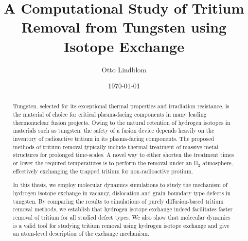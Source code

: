 \documentclass[english,twoside,openright]{HYgradu}
\title{A Computational Study of Tritium Removal from Tungsten using Isotope Exchange}
\author{Otto Lindblom}
\date{\today}
\begin{document}
\maketitle


\begin{abstract}
Tungsten, selected for its exceptional thermal properties and irradiation resistance, is the material of choice for critical plasma-facing components in many leading thermonuclear fusion projects.
Owing to the natural retention of hydrogen isotopes in materials such as tungsten, the safety of a fusion device depends heavily on the inventory of radioactive tritium in its plasma-facing components. 
The proposed methods of tritium removal typically include thermal treatment of massive metal structures for prolonged time-scales.
A novel way to either shorten the treatment times or lower the required temperatures is to perform the removal under an H$_2$ atmosphere, effectively exchanging the trapped tritium for non-radioactive protium. 

In this thesis, we employ molecular dynamics simulations to study the mechanism of hydrogen isotope exchange in vacancy, dislocation and grain boundary type defects in tungsten.
By comparing the results to simulations of purely diffusion-based tritium removal methods, we establish that hydrogen isotope exchange indeed facilitates faster removal of tritium for all studied defect types.  
We also show that molecular dynamics is a valid tool for studying tritium removal using hydrogen isotope exchange and give an atom-level description of the exchange mechanism.
\end{abstract}
\end{document}
